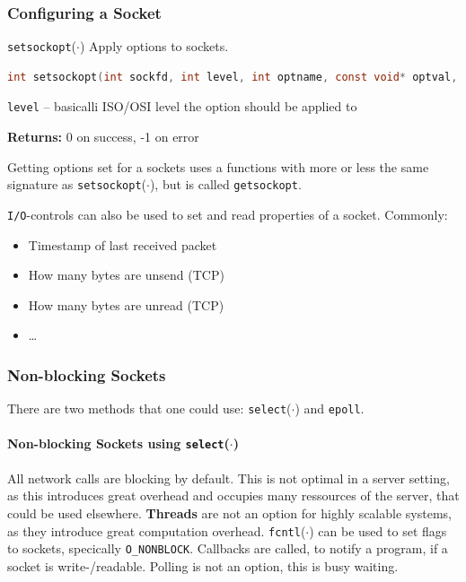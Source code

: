 \documentclass[english]{panikzettel}
\newcommand{\fkt}[1]{\texttt{#1}(\(\cdot\))}
\begin{document}
	\subsubsection{Configuring a Socket}

	\begin{defi}{\fkt{setsockopt}}
		Apply options to sockets.
		\begin{lstlisting}[language=C]
			int setsockopt(int sockfd, int level, int optname, const void* optval, socklen_t optlen);
		\end{lstlisting}
		\tcblower
		\texttt{level} – basicalli ISO/OSI level the option should be applied to
		
		\textbf{Returns:} 0 on success, -1 on error
	\end{defi}
	
	Getting options set for a sockets uses a functions with more or less the same signature as \fkt{setsockopt}, but is called \texttt{getsockopt}.

	\texttt{I/O}-controls can also be used to set and read properties of a socket. Commonly:
	\begin{itemize}
		\item Timestamp of last received packet
		\item How many bytes are unsend (TCP)
		\item How many bytes are unread (TCP)
		\item \dots
	\end{itemize}
	
	\subsubsection{Non-blocking Sockets}
	
	There are two methods that one could use: \fkt{select} and \texttt{epoll}.

	\paragraph{Non-blocking Sockets using \fkt{select}}
	All network calls are blocking by default. 
	This is not optimal in a server setting, as this introduces great overhead and occupies many ressources of the server, that could be used elsewhere. 
	\textbf{Threads} are not an option for highly scalable systems, as they introduce great computation overhead.
	\fkt{fcntl} can be used to set flags to sockets, specically \texttt{O\_NONBLOCK}.
	Callbacks are called, to notify a program, if a socket is write-/readable.
	Polling is not an option, this is busy waiting.	
\end{document}
